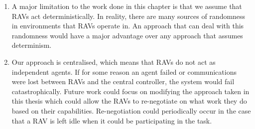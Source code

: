 \begin{enumerate}

    \item A major limitation to the work done in this chapter is that we assume that RAVs act deterministically. In reality, there are many sources of randomness in environments that RAVs operate in. An approach that can deal with this randomness would have a major advantage over any approach that assumes determinism.
    
    \item Our approach is centralised, which means that RAVs do not act as independent agents. If for some reason an agent failed or communications were lost between RAVs and the central controller, the system would fail catastrophically. Future work could focus on modifying the approach taken in this thesis which could allow the RAVs to re-negotiate on what work they do based on their capabilities. Re-negotiation could periodically occur in the case that a RAV is left idle when it could be participating in the task.
    

\end{enumerate}
